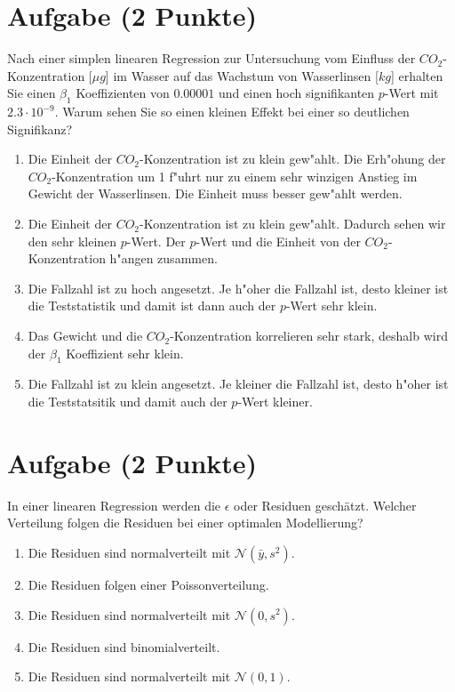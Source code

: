 \documentclass[a4paper, 9pt]{scrartcl}\usepackage[]{graphicx}\usepackage[]{xcolor}
\begin{document}
\section{Aufgabe \hfill (2 Punkte)}

Nach einer simplen linearen Regression zur Untersuchung vom Einfluss der
$CO_2$-Konzentration [$\mu g$] im Wasser auf das Wachstum von Wasserlinsen
[$kg$] erhalten Sie einen $\beta_1$ Koeffizienten von $0.00001$ und einen
hoch signifikanten $p$-Wert mit $2.3\cdot 10^{-9}$. Warum sehen Sie so einen kleinen
Effekt bei einer so deutlichen Signifikanz? 




\begin{enumerate}
\item [\textbf{A} \msquare] Die Einheit der $CO_2$-Konzentration ist zu klein gew{"a}hlt. Die Erh{"o}hung der $CO_2$-Konzentration um 1 f{"u}hrt nur zu einem sehr winzigen Anstieg im Gewicht der Wasserlinsen. Die Einheit muss besser gew{"a}hlt werden.
\item [\textbf{B} \msquare] Die Einheit der $CO_2$-Konzentration ist zu klein gew{"a}hlt. Dadurch sehen wir den sehr kleinen $p$-Wert. Der $p$-Wert und die Einheit von der $CO_2$-Konzentration h{"a}ngen zusammen.
\item [\textbf{C} \msquare] Die Fallzahl ist zu hoch angesetzt. Je h{"o}her die Fallzahl ist, desto kleiner ist die Teststatistik und damit ist dann auch der $p$-Wert sehr klein.
\item [\textbf{D} \msquare] Das Gewicht und die $CO_2$-Konzentration korrelieren sehr stark, deshalb wird der $\beta_1$ Koeffizient sehr klein.
\item [\textbf{E} \msquare] Die Fallzahl ist zu klein angesetzt. Je kleiner die Fallzahl ist, desto h{"o}her ist die Teststatsitik und damit auch der $p$-Wert kleiner. 
\end{enumerate}

\section{Aufgabe \hfill (2 Punkte)}

In einer linearen Regression werden die $\epsilon$ oder Residuen
gesch{\"a}tzt. Welcher Verteilung folgen die Residuen bei einer optimalen
Modellierung? 



\begin{enumerate}
\item [\textbf{A} \msquare] Die Residuen sind normalverteilt mit $\mathcal{N}(\bar{y}, s^2)$.
\item [\textbf{B} \msquare] Die Residuen folgen einer Poissonverteilung.
\item [\textbf{C} \msquare] Die Residuen sind normalverteilt mit $\mathcal{N}(0, s^2)$.
\item [\textbf{D} \msquare] Die Residuen sind binomialverteilt.
\item [\textbf{E} \msquare] Die Residuen sind normalverteilt mit $\mathcal{N}(0, 1)$.
\end{enumerate}
\end{document}

